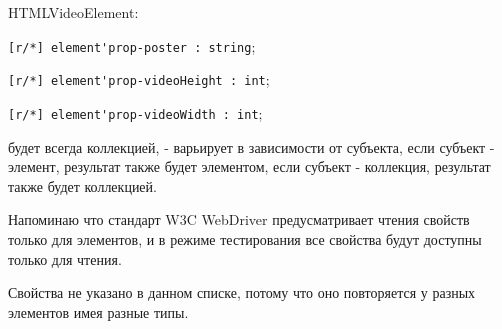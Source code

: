\begin{icItems}
	\item HTMLVideoElement:
	\begin{icItems}
		\item \lstinline|[r/*] element'prop-poster : string|;
		\item \lstinline|[r/*] element'prop-videoHeight : int|;
		\item \lstinline|[r/*] element'prop-videoWidth : int|;
	\end{icItems}
	
\end{icItems}

 будет всегда коллекцией,  - варьирует в зависимости от субъекта, если субъект - элемент, результат также будет элементом, если субъект - коллекция, результат также будет коллекцией. 

Напоминаю что стандарт W3C WebDriver предусматривает чтения свойств только для элементов, и в режиме тестирования все свойства будут доступны только для чтения.

Свойства  не указано в данном списке, потому что оно повторяется у разных элементов имея разные типы.


